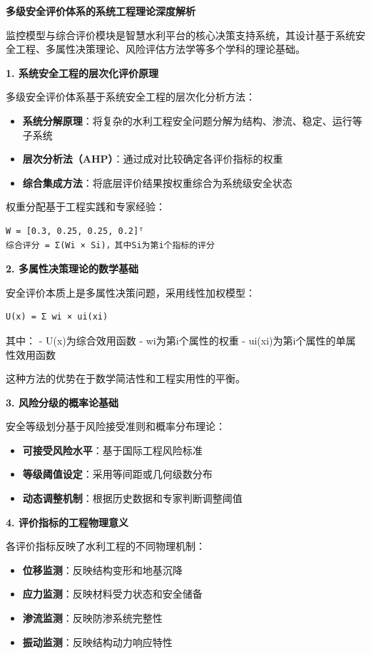 \textbf{多级安全评价体系的系统工程理论深度解析}

监控模型与综合评价模块是智慧水利平台的核心决策支持系统，其设计基于系统安全工程、多属性决策理论、风险评估方法学等多个学科的理论基础。

\textbf{1. 系统安全工程的层次化评价原理}

多级安全评价体系基于系统安全工程的层次化分析方法：

\begin{itemize}
\tightlist
\item
  \textbf{系统分解原理}：将复杂的水利工程安全问题分解为结构、渗流、稳定、运行等子系统
\item
  \textbf{层次分析法（AHP）}：通过成对比较确定各评价指标的权重
\item
  \textbf{综合集成方法}：将底层评价结果按权重综合为系统级安全状态
\end{itemize}

权重分配基于工程实践和专家经验：

\begin{lstlisting}
W = [0.3, 0.25, 0.25, 0.2]ᵀ
综合评分 = Σ(Wi × Si)，其中Si为第i个指标的评分
\end{lstlisting}

\textbf{2. 多属性决策理论的数学基础}

安全评价本质上是多属性决策问题，采用线性加权模型：

\begin{lstlisting}
U(x) = Σ wi × ui(xi)
\end{lstlisting}

其中： - U(x)为综合效用函数 - wi为第i个属性的权重 - ui(xi)为第i个属性的单属性效用函数

这种方法的优势在于数学简洁性和工程实用性的平衡。

\textbf{3. 风险分级的概率论基础}

安全等级划分基于风险接受准则和概率分布理论：

\begin{itemize}
\tightlist
\item
  \textbf{可接受风险水平}：基于国际工程风险标准
\item
  \textbf{等级阈值设定}：采用等间距或几何级数分布
\item
  \textbf{动态调整机制}：根据历史数据和专家判断调整阈值
\end{itemize}

\textbf{4. 评价指标的工程物理意义}

各评价指标反映了水利工程的不同物理机制：

\begin{itemize}
\tightlist
\item
  \textbf{位移监测}：反映结构变形和地基沉降
\item
  \textbf{应力监测}：反映材料受力状态和安全储备\\
\item
  \textbf{渗流监测}：反映防渗系统完整性
\item
  \textbf{振动监测}：反映结构动力响应特性
\end{itemize}


